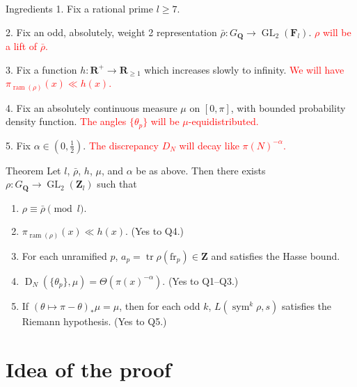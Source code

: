 \documentclass[handout]{beamer}
\DeclareMathOperator{\D}{D}
\DeclareMathOperator{\GL}{GL}
\DeclareMathOperator{\ram}{ram}
\DeclareMathOperator{\sym}{sym}
\DeclareMathOperator{\tr}{tr}
\newcommand{\bF}{\mathbf{F}}
\newcommand{\bQ}{\mathbf{Q}}
\newcommand{\bR}{\mathbf{R}}
\newcommand{\bZ}{\mathbf{Z}}
\newcommand{\frob}{\mathrm{fr}}
\begin{document}
\begin{frame}{Ingredients}
1. Fix a rational prime $l\geqslant 7$. 
\pause

2. Fix an odd, absolutely, weight 2 representation 
$\bar\rho\colon G_\bQ \to \GL_2(\bF_l)$.
\pause
\textcolor{red}{$\rho$ will be a lift of $\bar\rho$.}
\pause

3. Fix a function $h\colon \bR^+ \to \bR_{\geqslant 1}$ which increases slowly 
to infinity. 
\pause
\textcolor{red}{We will have $\pi_{\ram(\rho)}(x) \ll h(x)$.}
\pause

4. Fix an absolutely continuous measure $\mu$ on $[0,\pi]$, with bounded 
probability density function.
\pause
\textcolor{red}{The angles $\{\theta_p\}$ will be $\mu$-equidistributed.}
\pause

5. Fix $\alpha\in \left(0,\frac 1 2\right)$. 
\pause
\textcolor{red}{The discrepancy $D_N$ will decay like $\pi(N)^{-\alpha}$.}
\end{frame}


\begin{frame}{Theorem}
Let $l$, $\bar\rho$, $h$, $\mu$, and $\alpha$ be as above. Then there exists 
$\rho\colon G_\bQ \to \GL_2(\bZ_l)$ such that 
\begin{enumerate}
\item
$\rho \equiv \bar\rho\pmod{l}$. 
\pause

\item
$\pi_{\ram(\rho)}(x) \ll h(x)$. (Yes to Q4.)
\pause

\item
For each unramified $p$, $a_p = \tr \rho(\frob_p)\in \bZ$ and satisfies the 
Hasse bound.
\pause

\item
$\D_N(\{\theta_p\},\mu) = \Theta(\pi(x)^{-\alpha})$. (Yes to Q1--Q3.)
\pause

\item
If $(\theta\mapsto \pi-\theta)_\ast \mu = \mu$, then for each odd $k$, 
$L(\sym^k \rho,s)$ satisfies the Riemann hypothesis. (Yes to Q5.)
\end{enumerate}
\end{frame}






\section{Idea of the proof}
\end{document}
